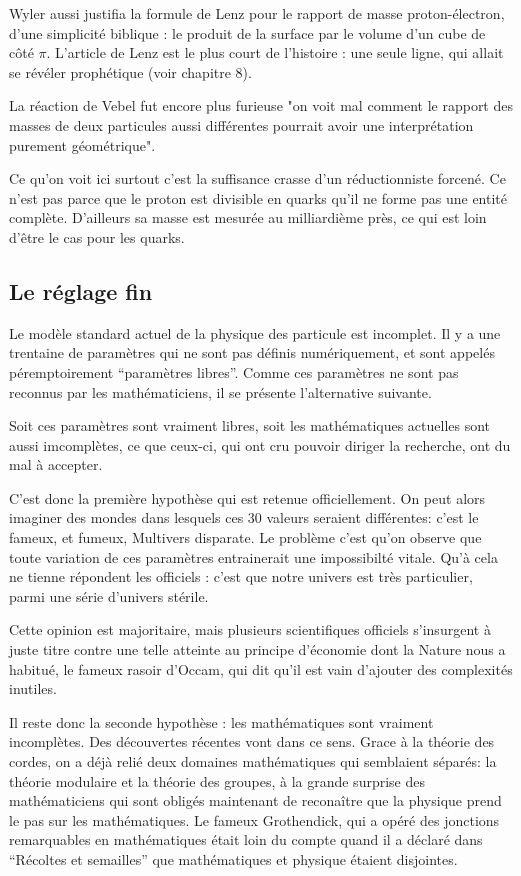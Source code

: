 \documentclass[a4paper,12pt]{article}
\begin{document}
Wyler aussi justifia la formule de Lenz pour le rapport de masse proton-électron, d'une simplicité biblique : le produit de la surface par le volume d'un cube de côté $\pi$. L'article de Lenz est le plus court de l'histoire : une seule ligne, qui allait se révéler prophétique (voir chapitre 8).


La réaction de Vebel fut encore plus furieuse "on voit mal comment le rapport des masses de deux particules aussi différentes pourrait avoir une interprétation purement géométrique".  

Ce qu'on voit ici surtout c'est la suffisance crasse d'un réductionniste forcené. Ce n'est pas parce que le proton est divisible en quarks qu'il ne forme pas une entité complète. D'ailleurs sa masse est mesurée au milliardième près, ce qui est loin d'être le cas pour les quarks.



\subsection{Le réglage fin}

Le modèle standard actuel de la physique des particule est incomplet. Il y a une trentaine de paramètres qui ne sont pas définis numériquement, et sont appelés péremptoirement ``paramètres libres''. Comme ces paramètres ne sont pas reconnus par les mathématiciens, il se présente l'alternative suivante. 


Soit ces paramètres sont vraiment libres, soit les mathématiques actuelles sont aussi imcomplètes, ce que ceux-ci, qui ont cru pouvoir diriger la recherche, ont du mal à accepter.

C'est donc la première hypothèse qui est retenue officiellement. On peut alors imaginer des mondes dans lesquels ces 30 valeurs seraient différentes: c'est le fameux, et fumeux, Multivers disparate. Le problème c'est qu'on observe que toute variation de ces paramètres entrainerait une impossibilté vitale. Qu'à cela ne tienne répondent les officiels : c'est que notre univers est très particulier, parmi une série d'univers stérile.

Cette opinion est majoritaire, mais plusieurs scientifiques officiels s'insurgent à juste titre contre une telle atteinte au principe d'économie dont la Nature nous a habitué, le fameux rasoir d'Occam, qui dit qu'il est vain d'ajouter des complexités inutiles. 

Il reste donc la seconde hypothèse : les mathématiques sont vraiment incomplètes. Des découvertes récentes vont dans ce sens. Grace à la théorie des cordes, on a déjà relié deux domaines mathématiques qui semblaient séparés: la théorie modulaire et la théorie des groupes, à la grande surprise des mathématiciens qui sont obligés maintenant de reconaître que la physique prend le pas sur les mathématiques. Le fameux Grothendick, qui a opéré des jonctions remarquables en mathématiques était loin du compte quand il a déclaré dans ``Récoltes et semailles'' que mathématiques et physique étaient disjointes.
\end{document}
